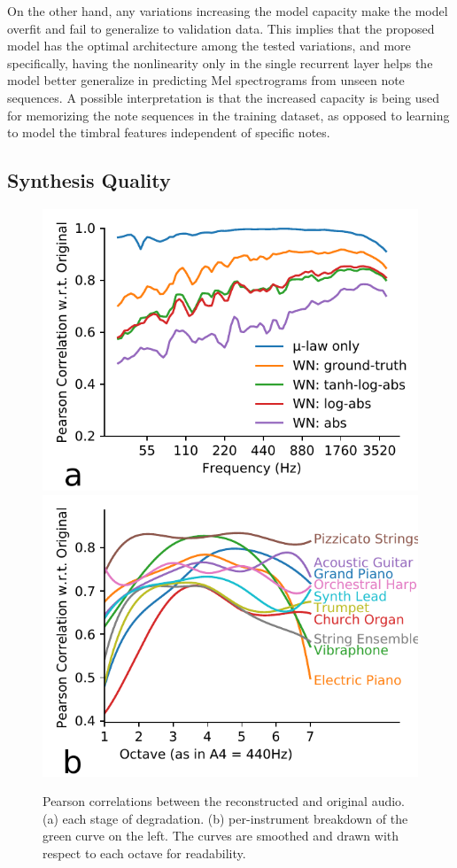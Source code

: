 On the other hand, any variations increasing the model capacity make the model overfit and fail to generalize to validation data.
This implies that the proposed model has the optimal architecture among the tested variations, and more specifically, having the nonlinearity only in the single recurrent layer helps the model better generalize in predicting Mel spectrograms from unseen note sequences.
A possible interpretation is that the increased capacity is being used for memorizing the note sequences in the training dataset, as opposed to learning to model the timbral features independent of specific notes.


\subsection{Synthesis Quality}

\begin{figure}[t]
	\vspace{1em}
	\hspace{-5pt}
	\includegraphics[width=0.5\linewidth]{correlations.pdf}
	\includegraphics[width=0.5\linewidth]{correlations-instrument.pdf}
	\caption{Pearson correlations between the reconstructed and original audio. (a) each stage of degradation. (b) per-instrument breakdown of the green curve on the left. The curves are smoothed and drawn with respect to each octave for readability.}
	\label{fig:correlations}
	\vspace{-1em}
\end{figure}

